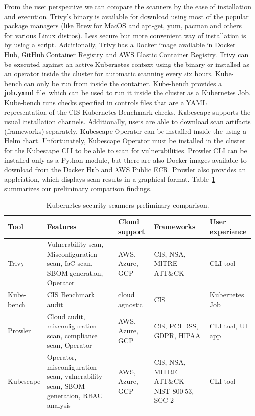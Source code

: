 From the user perspective we can compare the scanners by the ease of installation and execution. Trivy's binary is available for download using most of the popular package managers (like Brew for MacOS and apt-get, yum, pacman and others for various Linux distros). Less secure but more convenient way of installation is by using a script. Additionally, Trivy has a Docker image available in Docker Hub, GitHub Container Registry and AWS Elastic Container Registry. Trivy can be executed against an active Kubernetes context using the binary or installed as an operator inside the cluster for automatic scanning every six hours. Kube-bench can only be run from inside the container. Kube-bench provides a \textbf{job.yaml} file, which can be used to run it inside the cluster as a Kubernetes Job. Kube-bench runs checks specified in controls files that are a YAML representation of the CIS Kubernetes Benchmark checks. Kubescape supports the usual installation channels. Additionally, users are able to download scan artifacts (frameworks) separately. Kubescape Operator can be installed inside the using a Helm chart. Unfortunately, Kubescape Operator must be installed in the cluster for the Kubescape CLI to be able to scan for vulnerabilities. Prowler CLI can be installed only as a Python module, but there are also Docker images available to download from the Docker Hub and AWS Public ECR. Prowler also provides an applciation, which displays scan results in a graphical format. Table~\ref{tab:preliminary-scanner-comparison} summarizes our preliminary comparison findings.

\begin{table}[H]
    \begin{center}
        \begin{tabular}{
            | >{\raggedright\arraybackslash}p{} 
            | >{\raggedright\arraybackslash}p{} 
            | >{\raggedright\arraybackslash}p{} 
            | >{\raggedright\arraybackslash}p{} 
            | >{\raggedright\arraybackslash}p{} | }
        \hline
        \textbf{Tool} & \textbf{Features} & \textbf{Cloud support} & \textbf{Frameworks} & \textbf{User experience} \\
        \hline\hline
        Trivy & Vulnerability scan, Misconfiguration scan, IaC scan, SBOM generation, Operator & AWS, Azure, GCP & CIS, NSA, MITRE ATT\&CK & CLI tool \\
        \hline
        Kube-bench & CIS Benchmark audit & cloud agnostic & CIS & Kubernetes Job \\
        \hline
        Prowler & Cloud audit, misconfiguration scan, compliance scan, Operator & AWS, Azure, GCP & CIS, PCI-DSS, GDPR, HIPAA & CLI tool, UI app \\
        \hline
        Kubescape & Operator, misconfiguration scan, vulnerability scan, SBOM generation, RBAC analysis & AWS, Azure, GCP & CIS, NSA, MITRE ATT\&CK, NIST 800-53, SOC 2 & CLI tool \\
        \hline
        \end{tabular}
    \end{center}
    \caption{Kubernetes security scanners preliminary comparison.}
    \label{tab:preliminary-scanner-comparison}
\end{table}